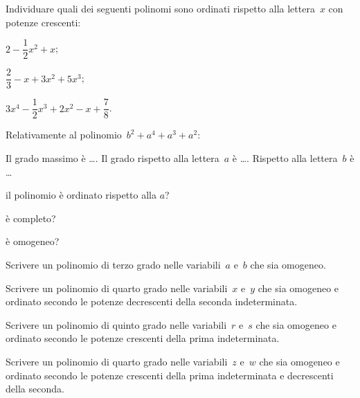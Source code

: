 \begin{multicols}{2}
\begin{esercizio}
\label{ese:10.4}
Individuare quali dei seguenti polinomi sono ordinati rispetto alla lettera~$x$ con potenze crescenti:

\begin{enumeratea}
\item $2-\dfrac{1}{2}x^2+x$;
\item $\dfrac{2}{3}-x+3x^2+5x^3$;
\item $3x^4-\dfrac{1}{2}x^3+2x^2-x+\dfrac{7}{8}$.
\end{enumeratea}
\end{esercizio}

\begin{esercizio}
\label{ese:10.5}
Relativamente al polinomio~$b^2+a^4+a^3+a^2$:
\begin{itemize*}
\item Il grado massimo è \ldots. Il grado rispetto alla lettera~$a$ è \ldots. Rispetto alla lettera~$b$ è \ldots
\item il polinomio è ordinato rispetto alla $a$? %
\item è completo? %
\item è omogeneo? %
\end{itemize*}
\end{esercizio}

\begin{esercizio}
\label{ese:10.6}
Scrivere un polinomio di terzo grado nelle variabili~$a$ e~$b$ che sia omogeneo.
\end{esercizio}

\begin{esercizio}
\label{ese:10.7}
Scrivere un polinomio di quarto grado nelle variabili~$x$ e~$y$ che sia omogeneo e ordinato secondo le
potenze decrescenti della seconda indeterminata.
\end{esercizio}

\begin{esercizio}
\label{ese:10.8}
Scrivere un polinomio di quinto grado nelle variabili~$r$ e~$s$ che sia omogeneo e ordinato secondo le
potenze crescenti della prima indeterminata.
\end{esercizio}

\begin{esercizio}
\label{ese:10.9}
Scrivere un polinomio di quarto grado nelle variabili~$z$ e~$w$ che sia omogeneo e ordinato secondo le
potenze crescenti della prima indeterminata e decrescenti della seconda.
\end{esercizio}


\end{multicols}
